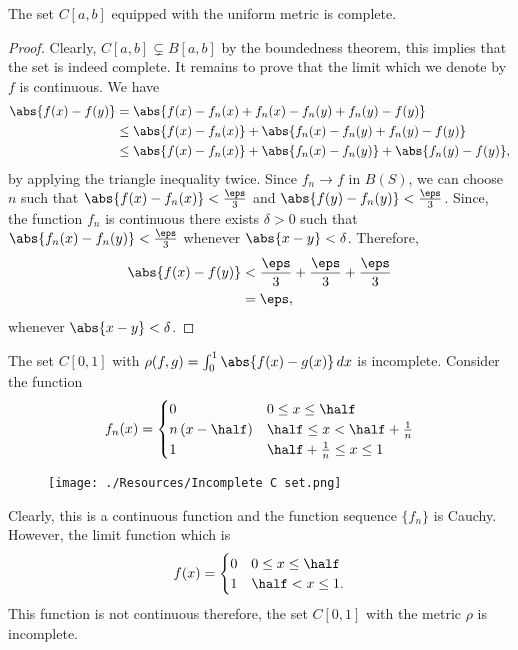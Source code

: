\documentclass[12pt, a4paper]{article}
\begin{document}
\begin{mdcor}
    The set \(C[a,b]\) equipped with the uniform metric is complete.
\end{mdcor}

\begin{proof}
    Clearly, \(C[a,b] \subsetneq B[a,b]\) by the boundedness theorem, this implies that the set is indeed complete. It remains to prove that the limit which we denote by \(f\) is continuous. We have 
    \[\begin{aligned}
        \abs{f(x)-f(y)} &= \abs{f(x)-f_n(x)+f_n(x)-f_n(y)+f_n(y)-f(y)} \\ 
        &\leq \abs{f(x)-f_n(x)} + \abs{f_n(x)-f_n(y)+f_n(y)-f(y)} \\
        &\leq \abs{f(x)-f_n(x)} + \abs{f_n(x)-f_n(y)} +\abs{f_n(y)-f(y)},
    \end{aligned}\]
    by applying the triangle inequality twice.
    Since \(f_n \to f\) in \(B(S)\), we can choose \(n\) such that \(\abs{f(x)-f_n(x)} <\frac{\eps}{3}\) and \(\abs{f(y)-f_n(y)}<\frac{\eps}{3}\). Since, the function \(f_n\) is continuous there exists \(\delta>0\) such that \(\abs{f_n(x)-f_n(y)} <\frac{\eps}{3}\) whenever \(\abs{x-y}<\delta\). Therefore,
    \[\begin{aligned}
        \abs{f(x)-f(y)}&<\frac{\eps}{3}+\frac{\eps}{3}+\frac{\eps}{3} \\
        &= \eps,
    \end{aligned}\]
    whenever \(\abs{x-y}<\delta\).
\end{proof}

\begin{mdexample}
    The set \(C[0,1]\) with \(\rho(f,g)=\int_0^1 \abs{f(x)-g(x)} \, dx\) is incomplete. Consider the function 
    \[\begin{aligned}
        f_n(x) = \begin{cases}
            0 & 0 \leq x \leq \half \\
            n\left( x-\half \right) & \half \leq x < \half + \frac{1}{n} \\
            1 & \half + \frac{1}{n} \leq x \leq 1
        \end{cases}
    \end{aligned}\]
    \begin{figure}[H]
         \begin{center}
             \texttt{[image: ./Resources/Incomplete C set.png]}
         \end{center}
    \end{figure}
    Clearly, this is a continuous function and the function sequence \(\{f_n\}\) is Cauchy. However, the limit function which is 
    \[\begin{aligned}
        f(x) = \begin{cases}
            0 & 0\leq x \leq \half \\
            1 & \half <  x \leq 1.
        \end{cases}
    \end{aligned}\]
    This function is not continuous therefore, the set \(C[0,1]\) with the metric \(\rho\) is incomplete.
\end{mdexample}
\end{document}
